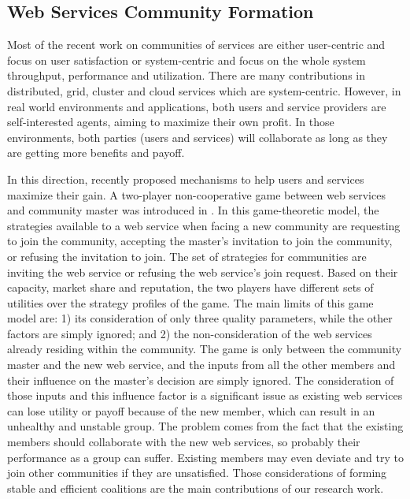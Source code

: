 \subsection{Web Services Community Formation}\label{sec:communities_for_rel}

Most of the recent work on communities of services are either
user-centric and focus on user satisfaction
\cite{Chun02user-centricperformance} or system-centric and focus
on the whole system throughput, performance and utilization. There
are many contributions in distributed, grid, cluster and cloud
services which are system-centric. However, in real world
environments and applications, both users and service providers
are self-interested agents, aiming to maximize their own profit.
In those environments, both parties (users and services) will
collaborate as long as they are getting more benefits and payoff.

In this direction, recently \cite{DBLP:conf/IEEEscc/LimTMB12,
DBLP:conf/IEEEscc/KhosravifarABT11, 10.1109/TSC.2012.12} proposed
mechanisms to help users and services maximize their gain. A
two-player non-cooperative game between web services and community
master was introduced in
\cite{DBLP:conf/IEEEscc/KhosravifarABT11}. In this game-theoretic
model, the strategies available to a web service when facing a new
community are requesting to join the community, accepting the
master's invitation to join the community, or refusing the
invitation to join. The set of strategies for communities are
inviting the web service or refusing the web service's join
request. Based on their capacity, market share and reputation, the
two players have different sets of utilities over the strategy
profiles of the game. The main limits of this game model are: 1)
its consideration of only three quality parameters, while the
other factors are simply ignored; and 2) the non-consideration of
the web services already residing within the community. The game
is only between the community master and the new web service, and
the inputs from all the other members and their influence on the
master's decision are simply ignored. The consideration of those
inputs and this influence factor is a significant issue as
existing web services can lose utility or payoff because of the
new member, which can result in an unhealthy and unstable group.
The problem comes from the fact that the existing members should
collaborate with the new web services, so probably their
performance as a group can suffer. Existing members may even
deviate and try to join other communities if they are unsatisfied.
Those considerations of forming stable and efficient coalitions
are the main contributions of our research work.

